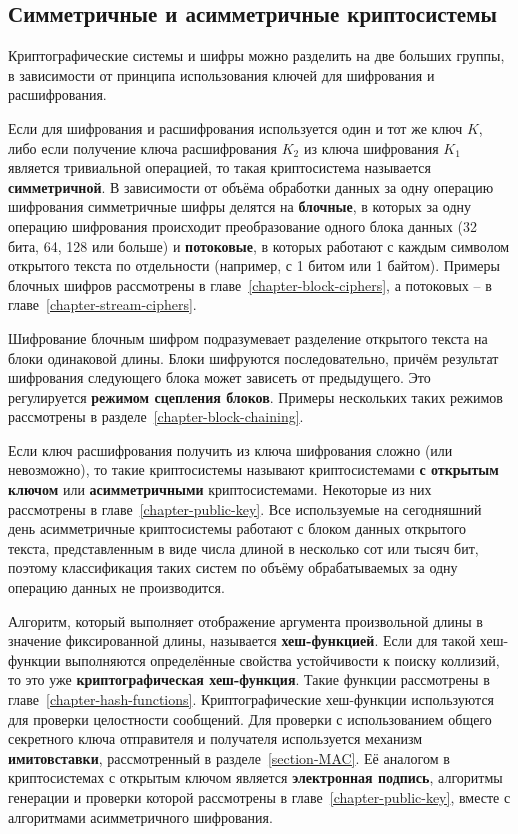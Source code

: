 \subsection{Симметричные и асимметричные криптосистемы}

Криптографические системы и шифры можно разделить на две больших группы, в зависимости от принципа использования ключей для шифрования и расшифрования.

Если для шифрования и расшифрования используется один и тот же ключ $K$, либо если получение ключа расшифрования $K_2$ из ключа шифрования $K_1$ является тривиальной операцией, то такая криптосистема называется \textbf{симметричной}. В зависимости от объёма обработки данных за одну операцию шифрования симметричные шифры делятся на \textbf{блочные}, в которых за одну операцию шифрования происходит преобразование одного блока данных (32 бита, 64, 128 или больше) и \textbf{потоковые}, в которых работают с каждым символом открытого текста по отдельности (например, с 1 битом или 1 байтом). Примеры блочных шифров рассмотрены в главе~\ref{chapter-block-ciphers}, а потоковых -- в главе~\ref{chapter-stream-ciphers}.

Шифрование блочным шифром подразумевает разделение открытого текста на блоки одинаковой длины. Блоки шифруются последовательно, причём результат шифрования следующего блока может зависеть от предыдущего. Это регулируется \textbf{режимом сцепления блоков}. Примеры нескольких таких режимов рассмотрены в разделе~\ref{chapter-block-chaining}.

Если ключ расшифрования получить из ключа шифрования сложно (или невозможно), то такие криптосистемы называют криптосистемами \textbf{с открытым ключом} или \textbf{асимметричными} криптосистемами. Некоторые из них рассмотрены в главе~\ref{chapter-public-key}. Все используемые на сегодняшний день асимметричные криптосистемы работают с блоком данных открытого текста, представленным в виде числа длиной в несколько сот или тысяч бит, поэтому классификация таких систем по объёму обрабатываемых за одну операцию данных не производится.

Алгоритм, который выполняет отображение аргумента произвольной длины в значение фиксированной длины, называется \textbf{хеш-функцией}. Если для такой хеш-функции выполняются определённые свойства устойчивости к поиску коллизий, то это уже \textbf{криптографическая хеш-функция}. Такие функции рассмотрены в главе~\ref{chapter-hash-functions}. Криптографические хеш-функции используются для проверки целостности сообщений. Для проверки с использованием общего секретного ключа отправителя и получателя используется механизм \textbf{имитовставки}, рассмотренный в разделе~\ref{section-MAC}. Её аналогом в криптосистемах с открытым ключом является \textbf{электронная подпись}, алгоритмы генерации и проверки которой рассмотрены в главе~\ref{chapter-public-key}, вместе с алгоритмами асимметричного шифрования.